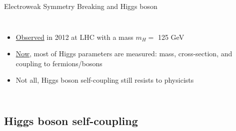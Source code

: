 \begin{frame}{Electroweak Symmetry Breaking and Higgs boson}
\begin{columns}
\begin{itemize}
    \item \underline{Observed} in 2012 at LHC with a mass $m_{H} = $ 125 GeV
    \item \underline{Now}, most of Higgs parameters are measured: mass, cross-section, and coupling to fermions/bosons
    \item \textcolor{HHred}{Not all, Higgs boson self-coupling still resists to physicists}
\end{itemize}
\end{columns}
\end{frame}

\subsection{Higgs boson self-coupling}

